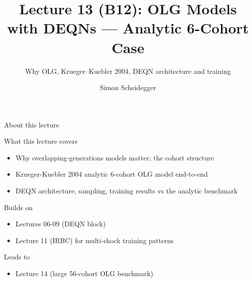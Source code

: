 \documentclass[aspectratio=169,11pt]{beamer}
\title[Lecture 13 (B12)]{Lecture 13 (B12): OLG Models with DEQNs --- Analytic 6-Cohort Case}
\subtitle{Why OLG, Krueger--Kuebler 2004, DEQN architecture and training}
\author{Simon Scheidegger}
\institute{HEC, University of Lausanne}
\date{}
\begin{document}
\providecommand{\exercisepause}{%
  \tikz[baseline=(X.base)]{\node[fill=darkgreen!80!black, text=white,
  rounded corners=2pt, inner sep=3pt, font=\scriptsize\bfseries](X){PAUSE};}}

{
\begin{frame}
\titlepage
\end{frame}
}

\begin{frame}{About this lecture}
\small
\begin{block}{What this lecture covers}
\begin{itemize}\itemsep2pt
  \item Why overlapping-generations models matter; the cohort structure
  \item Krueger-Kuebler 2004 analytic 6-cohort OLG model end-to-end
  \item DEQN architecture, sampling, training results vs the analytic benchmark
\end{itemize}
\end{block}
\begin{block}{Builds on}
\begin{itemize}\itemsep2pt
  \item Lectures 06-09 (DEQN block)
  \item Lecture 11 (IRBC) for multi-shock training patterns
\end{itemize}
\end{block}
\begin{block}{Leads to}
\begin{itemize}\itemsep2pt
  \item Lecture 14 (large 56-cohort OLG benchmark)
\end{itemize}
\end{block}
\end{frame}
\end{document}
